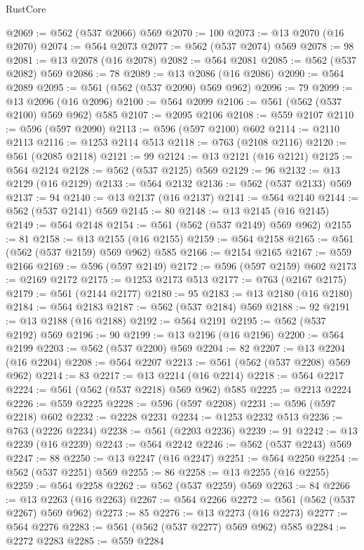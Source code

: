 \begin{lexlean}{RustCore}
\begin{coremodule}
@2069 := @562 (@537 @2066) @569
@2070 := 100
@2073 := @13 @2070 (@16 @2070)
@2074 := @564 @2073
@2077 := @562 (@537 @2074) @569
@2078 := 98
@2081 := @13 @2078 (@16 @2078)
@2082 := @564 @2081
@2085 := @562 (@537 @2082) @569
@2086 := 78
@2089 := @13 @2086 (@16 @2086)
@2090 := @564 @2089
@2095 := @561 (@562 (@537 @2090) @569 @962)
@2096 := 79
@2099 := @13 @2096 (@16 @2096)
@2100 := @564 @2099
@2106 := @561 (@562 (@537 @2100) @569 @962) @585
@2107 := @2095 @2106
@2108 := @559 @2107
@2110 := @596 (@597 @2090)
@2113 := @596 (@597 @2100) @602
@2114 := @2110 @2113
@2116 := @1253 @2114 @513
@2118 := @763 (@2108 @2116)
@2120 := @561 (@2085 @2118)
@2121 := 99
@2124 := @13 @2121 (@16 @2121)
@2125 := @564 @2124
@2128 := @562 (@537 @2125) @569
@2129 := 96
@2132 := @13 @2129 (@16 @2129)
@2133 := @564 @2132
@2136 := @562 (@537 @2133) @569
@2137 := 94
@2140 := @13 @2137 (@16 @2137)
@2141 := @564 @2140
@2144 := @562 (@537 @2141) @569
@2145 := 80
@2148 := @13 @2145 (@16 @2145)
@2149 := @564 @2148
@2154 := @561 (@562 (@537 @2149) @569 @962)
@2155 := 81
@2158 := @13 @2155 (@16 @2155)
@2159 := @564 @2158
@2165 := @561 (@562 (@537 @2159) @569 @962) @585
@2166 := @2154 @2165
@2167 := @559 @2166
@2169 := @596 (@597 @2149)
@2172 := @596 (@597 @2159) @602
@2173 := @2169 @2172
@2175 := @1253 @2173 @513
@2177 := @763 (@2167 @2175)
@2179 := @561 (@2144 @2177)
@2180 := 95
@2183 := @13 @2180 (@16 @2180)
@2184 := @564 @2183
@2187 := @562 (@537 @2184) @569
@2188 := 92
@2191 := @13 @2188 (@16 @2188)
@2192 := @564 @2191
@2195 := @562 (@537 @2192) @569
@2196 := 90
@2199 := @13 @2196 (@16 @2196)
@2200 := @564 @2199
@2203 := @562 (@537 @2200) @569
@2204 := 82
@2207 := @13 @2204 (@16 @2204)
@2208 := @564 @2207
@2213 := @561 (@562 (@537 @2208) @569 @962)
@2214 := 83
@2217 := @13 @2214 (@16 @2214)
@2218 := @564 @2217
@2224 := @561 (@562 (@537 @2218) @569 @962) @585
@2225 := @2213 @2224
@2226 := @559 @2225
@2228 := @596 (@597 @2208)
@2231 := @596 (@597 @2218) @602
@2232 := @2228 @2231
@2234 := @1253 @2232 @513
@2236 := @763 (@2226 @2234)
@2238 := @561 (@2203 @2236)
@2239 := 91
@2242 := @13 @2239 (@16 @2239)
@2243 := @564 @2242
@2246 := @562 (@537 @2243) @569
@2247 := 88
@2250 := @13 @2247 (@16 @2247)
@2251 := @564 @2250
@2254 := @562 (@537 @2251) @569
@2255 := 86
@2258 := @13 @2255 (@16 @2255)
@2259 := @564 @2258
@2262 := @562 (@537 @2259) @569
@2263 := 84
@2266 := @13 @2263 (@16 @2263)
@2267 := @564 @2266
@2272 := @561 (@562 (@537 @2267) @569 @962)
@2273 := 85
@2276 := @13 @2273 (@16 @2273)
@2277 := @564 @2276
@2283 := @561 (@562 (@537 @2277) @569 @962) @585
@2284 := @2272 @2283
@2285 := @559 @2284

\end{coremodule}
\end{lexlean}
